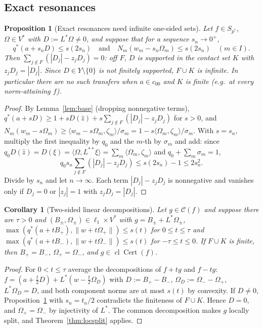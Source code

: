 \documentclass[10pt]{amsart}
\newtheorem{proposition}[theorem]{Proposition}
\newtheorem{corollary}[theorem]{Corollary}
\theoremstyle{definition}
\theoremstyle{remark}
\newcommand{\Cset}{\mathcal C}
\newcommand{\Cert}{\operatorname{Cert}}
\newcommand{\cl}{\operatorname{cl}}
\newcommand{\zh}{\hat z}
\newcommand{\ip}[2]{\langle #1,#2\rangle}
\begin{document}
\subsection{Exact resonances}

\begin{proposition}[Exact resonances need infinite one-sided sets]\label{prop:exact}
Let $f\in S_{p^*}$, $\Omega\in V^*$ with $D:=L^*\Omega\ne0$, and suppose that
for a sequence $s_n\to0^+$,
\[
 q^*(a+s_nD)\le s(2s_n)\quad\text{and}\quad N_m(w_m-s_n\Omega_m)\le s(2s_n)
 \quad(m\in I).
\]
Then $\sum_{j\notin F}(|D_j|-z_jD_j)=0$: off $F$, $D$ is supported in the
contact set $K$ with $z_jD_j=|D_j|$.  Since $D\in Y\setminus\{0\}$ is not
finitely supported, $F\cup K$ is infinite.  In particular there are no such
transfers when $a\in c_{00}$ and $K$ is finite \textup{(}e.g.\ at every
norm-attaining $f$\textup{)}.
\end{proposition}

\begin{proof}
By Lemma~\ref{lem:base} (dropping nonnegative terms),
$q^*(a+sD)\ge1+sD(\zh)+s\sum_{j\notin F}(|D_j|-z_jD_j)$ for $s>0$, and
$N_m(w_m-s\Omega_m)\ge\ip{w_m-s\Omega_m}{\zeta_m}/\sigma_m=1-s\ip{\Omega_m}
{\zeta_m}/\sigma_m$.  With $s=s_n$, multiply the first inequality by $q_0$
and the $m$-th by $\sigma_m$ and add: since $q_0D(\zh)=D(\xi)=\ip{\Omega}
{L^{**}\xi}=\sum_m\ip{\Omega_m}{\zeta_m}$ and $q_0+\sum_m\sigma_m=1$,
\[
 q_0s_n\sum_{j\notin F}(|D_j|-z_jD_j)\le s(2s_n)-1\le2s_n^2 .
\]
Divide by $s_n$ and let $n\to\infty$.  Each term $|D_j|-z_jD_j$ is
nonnegative and vanishes only if $D_j=0$ or $|z_j|=1$ with $z_jD_j=|D_j|$.
\end{proof}

\begin{corollary}[Two-sided linear decompositions]\label{cor:twosided}
Let $g\in\Cset(f)$ and suppose there are $\tau>0$ and
$(B_\pm,\Omega_\pm)\in\ell_1\times V^*$ with $g=B_\pm+L^*\Omega_\pm$,
$\max(q^*(a+tB_+),\|w+t\Omega_+\|)\le s(t)$ for $0\le t\le\tau$ and
$\max(q^*(a+tB_-),\|w+t\Omega_-\|)\le s(t)$ for $-\tau\le t\le0$.  If
$F\cup K$ is finite, then $B_+=B_-$, $\Omega_+=\Omega_-$, and
$g\in\cl\Cert(f)$.
\end{corollary}

\begin{proof}
For $0<t\le\tau$ average the decompositions of $f+tg$ and $f-tg$:
$f=(a+\frac t2D)+L^*(w-\frac t2\Omega_D)$ with $D:=B_+-B_-$,
$\Omega_D:=\Omega_--\Omega_+$, $L^*\Omega_D=D$, and both component norms are
at most $s(t)$ by convexity.  If $D\ne0$, Proposition~\ref{prop:exact} with
$s_n=t_n/2$ contradicts the finiteness of $F\cup K$.  Hence $D=0$, and
$\Omega_+=\Omega_-$ by injectivity of $L^*$.  The common decomposition makes
$g$ locally split, and Theorem~\ref{thm:locsplit} applies.
\end{proof}
\end{document}
